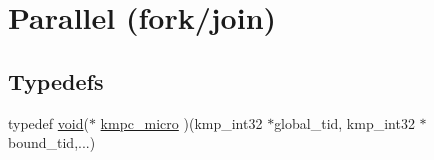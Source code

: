\hypertarget{group__PARALLEL}{\section{Parallel (fork/join)}
\label{group__PARALLEL}
}
\subsection*{Typedefs}
\begin{DoxyCompactItemize}
\item 
typedef \hyperlink{ittnotify__static_8h_af941d56e55e3c5465135b60c4d6343ed}{void}($\ast$ \hyperlink{group__PARALLEL_gab49014fb4572e7d0f308fd9b1824daf7}{kmpc\-\_\-micro} )(kmp\-\_\-int32 $\ast$global\-\_\-tid, kmp\-\_\-int32 $\ast$bound\-\_\-tid,...)
\end{DoxyCompactItemize}
